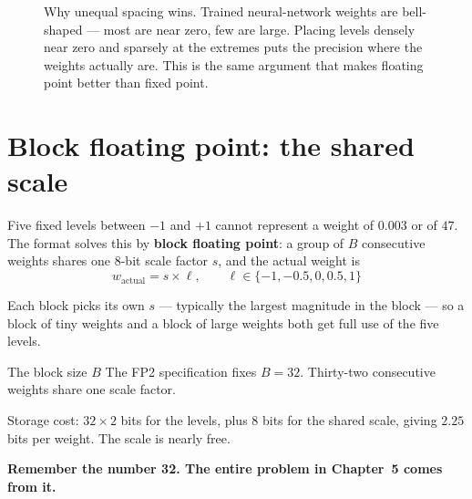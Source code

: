 \documentclass[11pt,a4paper]{report}
\newcommand{\jargon}[1]{\textcolor{acc}{\textbf{#1}}}
\begin{document}
\begin{figure}[h]
\centering
{}
\caption{Why unequal spacing wins. Trained neural-network weights are
bell-shaped --- most are near zero, few are large. Placing levels densely near
zero and sparsely at the extremes puts the precision where the weights
actually are. This is the same argument that makes floating point better than
fixed point.}
\end{figure}

\section{Block floating point: the shared scale}

Five fixed levels between $-1$ and $+1$ cannot represent a weight of $0.003$
or of $47$. The format solves this by \jargon{block floating point}: a group
of $B$ consecutive weights shares one 8-bit scale factor $s$, and the actual
weight is
\[
w_{\mathrm{actual}} = s \times \ell, \qquad \ell \in \{-1,-0.5,0,0.5,1\}
\]

Each block picks its own $s$ --- typically the largest magnitude in the block
--- so a block of tiny weights and a block of large weights both get full use
of the five levels.

\begin{keybox}{The block size $B$}
The FP2 specification fixes $B = 32$. Thirty-two consecutive weights share one
scale factor.

Storage cost: $32 \times 2$ bits for the levels, plus $8$ bits for the shared
scale, giving $2.25$ bits per weight. The scale is nearly free.

\textbf{Remember the number 32. The entire problem in Chapter~5 comes from
it.}
\end{keybox}
\end{document}
